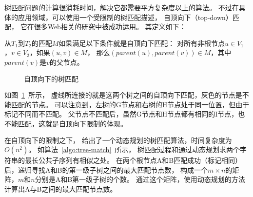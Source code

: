 树匹配问题的计算很消耗时间，解决它都需要平方复杂度以上的算法。
不过在具体的应用领域，可以使用一个受限制的树匹配描述，
自顶向下（top-down）匹配，
它在很多Web相关的研究中被成功运用。
其定义如下：

\begin{definition}
\label{def:top-down-mapping}
从$T_1$到$T_2$的匹配$M$如果满足以下条件就是自顶向下匹配：
对所有非根节点$u \in V_1$，$v \in V_2$，如果$(u,v) \in M$，
那么$(parent(u), parent(v)) \in M$，其中$parent(v)$是$v$的父节点。
\end{definition}

\begin{figure}[htbp]
\centering
{}
\caption{自顶向下的树匹配}
\label{fig:top-down-mapping}
\end{figure}

如图~\ref{fig:top-down-mapping}~所示，
虚线所连接的就是这两个树之间的自顶向下匹配，灰色的节点是不能匹配的节点。
可以注意到，左树的G节点和右树的H节点处于同一位置，但由于标记不同而不匹配。
父节点不匹配后，虽然G节点和H节点都有相同的I节点，也不能匹配，这就是自顶向下限制的体现。

在自顶向下的限制之下，\cite{yang1991identifying}
给出了一个动态规划的树匹配算法，时间复杂度为$O(n^2)$。
如算法~\ref{algo:tree-match}~所示，
树匹配过程和通过动态规划求两个字符串的最长公共子序列有相似之处。
在两个根节点A和B匹配成功（标记相同）后，递归寻找A和B的第一级子树之间的最大匹配节点数，
构成一个$m \times n$的矩阵，$m$和$n$分别是A和B第一级子树的个数。
通过这个矩阵，使用动态规划的方法计算出A与B之间的最大匹配节点数。

